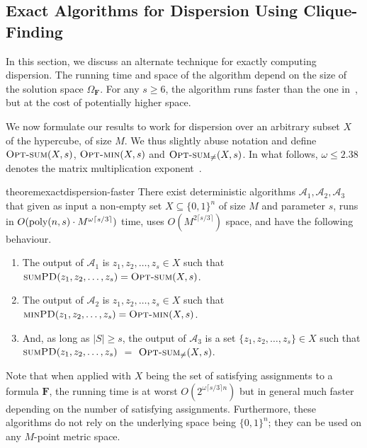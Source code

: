 \documentclass[11pt, letterpaper]{article}
\theoremstyle{definition}
\newcommand{\Q}[1]{\{0,1\}^{#1}}
\newcommand{\f}{\mathbf{F}}
\newcommand{\Om}{\Omega_{\f}}
\newcommand{\PD}{\textsc{minPD}}
\newcommand{\SPD}{\textsc{sumPD}}
\newcommand{\opts}{\textsc{Opt-sum}}
\newcommand{\optm}{\textsc{Opt-min}}
\newcommand{\poly}{\mbox{\rm poly}}
\begin{document}
\subsection{Exact Algorithms for Dispersion Using Clique-Finding}\label{sec:exactdisp faster}

 In this section, we discuss an alternate technique for exactly computing dispersion. The running time and space of the algorithm depend on the size of the solution space $\Om$. For any $s\geq 6$, the algorithm runs faster than the one in~, but at the cost of potentially higher space.

 We now formulate our results to work for dispersion over an arbitrary subset $X$ of the hypercube, of size $M$. We thus slightly abuse notation and define $\opts(X,s)$, $\optm(X,s)$ and $\opts_{\neq}(X,s)$. In what follows, $\omega \le 2.38$ denotes the matrix multiplication exponent~\cite{williams2024new}.


\begin{restatable}{theorem}{exactdispersion-faster}\label{thm:exactdisp faster}
	There exist deterministic algorithms $\mathcal{A}_1, \mathcal{A}_2, \mathcal{A}_3$ that given as input a non-empty set $X \subseteq \Q{n}$ of size $M$ and parameter $s$, runs in $O(\poly(n, s) \cdot M^{\omega \lceil s/3 \rceil})$ time, uses $O(M^{2 \lceil s/3 \rceil})$ space, and have the following behaviour.
 \sloppy
 \begin{enumerate}
     \item The output of $\mathcal{A}_1$ is $z_1, z_2, \dots, z_s \in X$ such that $\SPD(z_1, z_2, \dots, z_s) = \opts(X,s)$. 
     \item The output of $\mathcal{A}_2$ is $z_1, z_2, \dots, z_s \in X$ such that $\PD(z_1, z_2, \dots, z_s) = \optm(X,s)$. 
     \item And, as long as $|S| \geq s$, the output of $\mathcal{A}_3$ is a set $\{z_1, z_2, \dots, z_s\} \in X$ such that $\SPD(z_1, z_2, \dots, z_s)$ $ =$ $\opts_{\neq}(X,s)$. 
 \end{enumerate}
\end{restatable}

Note that when applied with $X$ being the set of satisfying assignments to a formula $\f$, the running time is at worst $O(2^{\omega \lceil s/3 \rceil n})$ but in general much faster depending on the number of satisfying assignments.  Furthermore, these algorithms do not rely on the underlying space being $\Q{n}$; they can be used on any $M$-point metric space.
\end{document}

